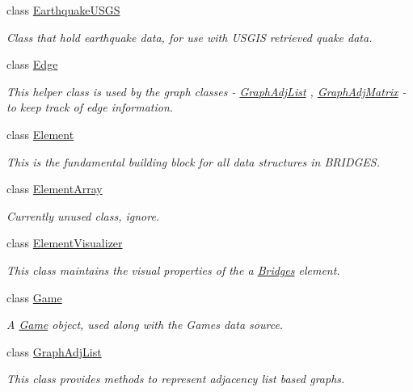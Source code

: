 \begin{DoxyCompactItemize}
class \mbox{\hyperlink{classbridges_1_1_earthquake_u_s_g_s}{Earthquake\+U\+S\+GS}}
\begin{DoxyCompactList}\small\item\em Class that hold earthquake data, for use with U\+S\+G\+IS retrieved quake data. \end{DoxyCompactList}\item 
class \mbox{\hyperlink{classbridges_1_1_edge}{Edge}}
\begin{DoxyCompactList}\small\item\em This helper class is used by the graph classes -\/ \mbox{\hyperlink{classbridges_1_1_graph_adj_list}{Graph\+Adj\+List}} , \mbox{\hyperlink{classbridges_1_1_graph_adj_matrix}{Graph\+Adj\+Matrix}} -\/ to keep track of edge information. \end{DoxyCompactList}\item 
class \mbox{\hyperlink{classbridges_1_1_element}{Element}}
\begin{DoxyCompactList}\small\item\em This is the fundamental building block for all data structures in B\+R\+I\+D\+G\+ES. \end{DoxyCompactList}\item 
class \mbox{\hyperlink{classbridges_1_1_element_array}{Element\+Array}}
\begin{DoxyCompactList}\small\item\em Currently unused class, ignore. \end{DoxyCompactList}\item 
class \mbox{\hyperlink{classbridges_1_1_element_visualizer}{Element\+Visualizer}}
\begin{DoxyCompactList}\small\item\em This class maintains the visual properties of the a \mbox{\hyperlink{namespacebridges_1_1_bridges}{Bridges}} element. \end{DoxyCompactList}\item 
class \mbox{\hyperlink{classbridges_1_1_game}{Game}}
\begin{DoxyCompactList}\small\item\em A \mbox{\hyperlink{classbridges_1_1_game}{Game}} object, used along with the Games data source. \end{DoxyCompactList}\item 
class \mbox{\hyperlink{classbridges_1_1_graph_adj_list}{Graph\+Adj\+List}}
\begin{DoxyCompactList}\small\item\em This class provides methods to represent adjacency list based graphs. \end{DoxyCompactList}\item 

\end{DoxyCompactItemize}

